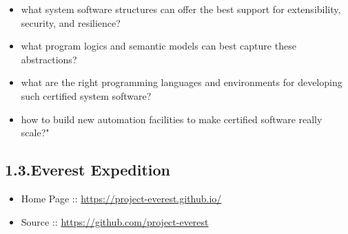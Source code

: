 \documentclass[12pt,twoside]{article}
\begin{document}
\begin{itemize}[noitemsep,topsep=\mdcompacttopsep]%

\item{}what system software structures can offer the best support for extensibility, security, and resilience?%

\item{}what program logics and semantic models can best capture these abstractions?%

\item{}what are the right programming languages and environments for developing such certified system software?%

\item{}how to build new automation facilities to make certified software really scale?"%
\end{itemize}%

\subsection{1.3.\hspace*{0.5em}Everest Expedition}\label{sec-everest-expedition}%

\begin{itemize}[noitemsep,topsep=\mdcompacttopsep]%

\item{}Home Page :: \href{https://project-everest.github.io/}{{\ttfamily https://\hspace{0pt}project-\hspace{0pt}everest.\hspace{0pt}github.\hspace{0pt}io/\hspace{0pt}}}%

\item{}Source :: \href{https://github.com/project-everest}{{\ttfamily https://\hspace{0pt}github.\hspace{0pt}com/\hspace{0pt}project-\hspace{0pt}everest}}%
\end{itemize}%
\end{document}
